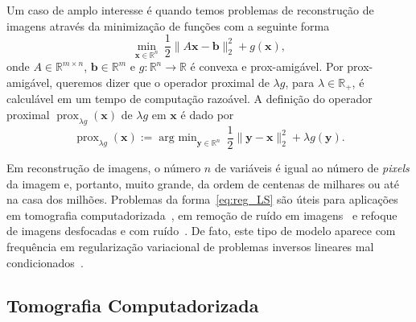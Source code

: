\documentclass[12pt]{article}
\DeclareMathOperator{\prox}{prox}
\DeclareMathOperator*{\argmin}{arg\ min}
\begin{document}
Um caso de amplo interesse é quando temos problemas de reconstrução de imagens através da minimização de funções com a seguinte forma
\begin{equation}\label{eq:reg_LS}
    \min_{\bm x\in\mathbb R^n}\ \frac12\|A\bm x - \bm b\|_2^2 + g( \bm x ),
\end{equation}
onde $A \in \mathbb R^{m\times n}$, $\bm b \in \mathbb R^m$ e $g : \mathbb R^n \to \mathbb R$ é convexa e prox-amigável. Por prox-amigável, queremos dizer que o operador proximal de $\lambda g$, para $\lambda \in \mathbb R_+$, é calculável em um tempo de computação razoável. A definição do operador proximal $\prox_{\lambda g}( \bm x )$ de $\lambda g$ em $\bm x$ é dado por
$$
    \prox_{\lambda g}( \bm x ) := \argmin_{\bm y \in \mathbb R^n}\ \frac 12\| \bm y - \bm x \|_2^2 + \lambda g( \bm y ).
$$

Em reconstrução de imagens, o número $n$ de variáveis é igual ao número de \emph{pixels} da imagem e, portanto, muito grande, da ordem de centenas de milhares ou até na casa dos milhões. Problemas da forma~\eqref{eq:reg_LS} são úteis para aplicações em tomografia computadorizada~\cite{her80,kas88,nat86,naw01}, em remoção de ruído em imagens~\cite{rof92,obg05,tnv04} e refoque de imagens desfocadas e com ruído~\cite{obg05,bet09,bet09b}. De fato, este tipo de modelo aparece com frequência em regularização variacional de problemas inversos lineares mal condicionados~\cite{ehn00}.

\subsection{Tomografia Computadorizada}
\end{document}
